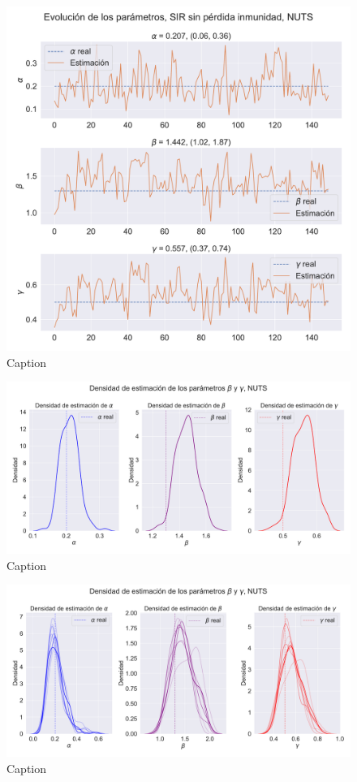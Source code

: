 \begin{figure}[h]
    \centering
    \includegraphics[width=0.8\linewidth]{img/content/chapter4/NUTS_sir_rec_params_trace.pdf}
    \caption{Caption}
    \label{fig:enter-label}
\end{figure}

\begin{figure}[h]
    \centering
    \includegraphics[width=0.8\linewidth]{img/content/chapter4/NUTS_sir_rec_params_density.pdf}
    \caption{Caption}
    \label{fig:enter-label}
\end{figure}

\begin{figure}[h]
    \centering
    \includegraphics[width=0.8\linewidth]{img/content/chapter4/NUTS_sir_rec_params_density_mean.pdf}
    \caption{Caption}
    \label{fig:enter-label}
\end{figure}

